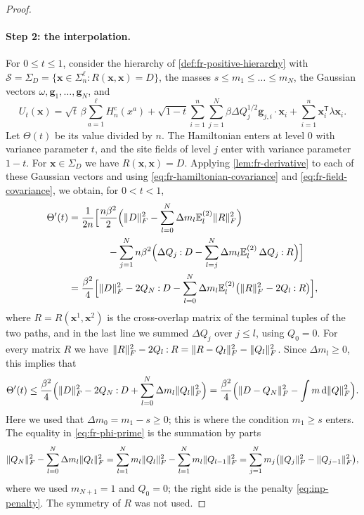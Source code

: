 \begin{proof}
\paragraph{Step 2: the interpolation.} For $0\le t\le1$, consider the hierarchy of \cref{def:fr-positive-hierarchy} with $\mathcal S=\Sigma_D=\{\bm x\in\Sigma_n^\ell:R(\bm x,\bm x)=D\}$, the masses $s\le m_1\le\dots\le m_N$, the Gaussian vectors $\omega,\mathbf g_1,\dots,\mathbf g_N$, and
\[
 U_t(\bm x)=\sqrt t\,\beta\sum_{a=1}^\ell H^c_n(x^a)
 +\sqrt{1-t}\sum_{i=1}^n\sum_{j=1}^N\beta\Delta Q_j^{1/2}\mathbf g_{j,i}\cdot\bm x_i
 +\sum_{i=1}^n\bm x_i^{\mathsf T}\lambda\bm x_i.
\]
Let $\Theta(t)$ be its value divided by $n$. The Hamiltonian enters at level $0$ with variance parameter $t$, and the site fields of level $j$ enter with variance parameter $1-t$. For $\bm x\in\Sigma_D$ we have $R(\bm x,\bm x)=D$. Applying \cref{lem:fr-derivative} to each of these Gaussian vectors and using \eqref{eq:fr-hamiltonian-covariance} and \eqref{eq:fr-field-covariance}, we obtain, for $0<t<1$,
\begin{align*}
 \Theta'(t)
 &=\frac1{2n}\Bigl[\frac{n\beta^2}2\Bigl(\lVert D\rVert_F^2-\sum_{l=0}^N\Delta m_l\mathbb E^{(2)}_l\lVert R\rVert_F^2\Bigr)\\
 &\qquad\qquad-\sum_{j=1}^Nn\beta^2\Bigl(\Delta Q_j\mathbin{:}D-\sum_{l=j}^N\Delta m_l\mathbb E^{(2)}_l\,\Delta Q_j\mathbin{:}R\Bigr)\Bigr]\\
 &=\frac{\beta^2}4\Bigl[\lVert D\rVert_F^2-2Q_N\mathbin{:}D-\sum_{l=0}^N\Delta m_l\mathbb E^{(2)}_l\bigl(\lVert R\rVert_F^2-2Q_l\mathbin{:}R\bigr)\Bigr],
\end{align*}
where $R=R(\bm x^1,\bm x^2)$ is the cross-overlap matrix of the terminal tuples of the two paths, and in the last line we summed $\Delta Q_j$ over $j\le l$, using $Q_0=0$. For every matrix $R$ we have $\lVert R\rVert_F^2-2Q_l\mathbin{:}R=\lVert R-Q_l\rVert_F^2-\lVert Q_l\rVert_F^2$. Since $\Delta m_l\ge0$, this implies that
\begin{equation}\label{eq:fr-phi-prime}
 \Theta'(t)\le\frac{\beta^2}4\Bigl(\lVert D\rVert_F^2-2Q_N\mathbin{:}D+\sum_{l=0}^N\Delta m_l\lVert Q_l\rVert_F^2\Bigr)
 =\frac{\beta^2}4\Bigl(\lVert D-Q_N\rVert_F^2-\int m\,\mathrm d\lVert Q\rVert_F^2\Bigr).
\end{equation}
Here we used that $\Delta m_0=m_1-s\ge0$; this is where the condition $m_1\ge s$ enters. The equality in \eqref{eq:fr-phi-prime} is the summation by parts
\[
 \lVert Q_N\rVert_F^2-\sum_{l=0}^N\Delta m_l\lVert Q_l\rVert_F^2
 =\sum_{l=1}^Nm_l\lVert Q_l\rVert_F^2-\sum_{l=1}^{N}m_l\lVert Q_{l-1}\rVert_F^2
 =\sum_{j=1}^Nm_j\bigl(\lVert Q_j\rVert_F^2-\lVert Q_{j-1}\rVert_F^2\bigr),
\]
where we used $m_{N+1}=1$ and $Q_0=0$; the right side is the penalty \eqref{eq:inp-penalty}. The symmetry of $R$ was not used.


\end{proof}
